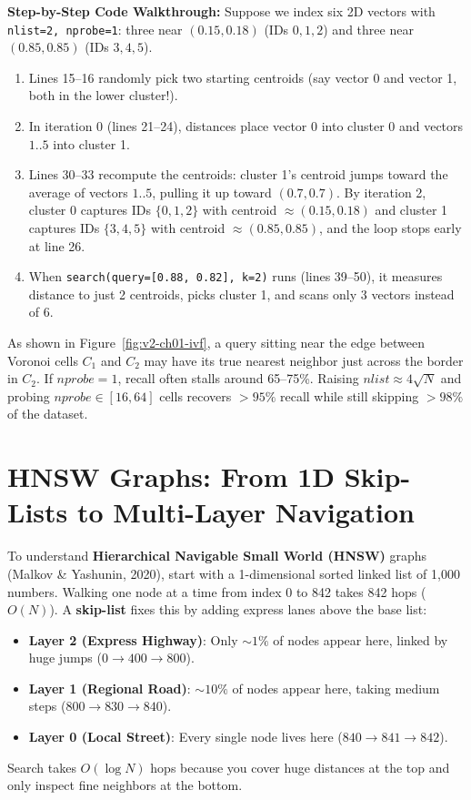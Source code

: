 \textbf{Step-by-Step Code Walkthrough:} Suppose we index six 2D vectors with \texttt{nlist=2, nprobe=1}: three near $(0.15, 0.18)$ (IDs $0, 1, 2$) and three near $(0.85, 0.85)$ (IDs $3, 4, 5$).
\begin{enumerate}[leftmargin=18pt]
  \item Lines 15--16 randomly pick two starting centroids (say vector 0 and vector 1, both in the lower cluster!).
  \item In iteration 0 (lines 21--24), distances place vector 0 into cluster 0 and vectors $1..5$ into cluster 1.
  \item Lines 30--33 recompute the centroids: cluster 1's centroid jumps toward the average of vectors $1..5$, pulling it up toward $(0.7, 0.7)$. By iteration 2, cluster 0 captures IDs $\{0, 1, 2\}$ with centroid $\approx (0.15, 0.18)$ and cluster 1 captures IDs $\{3, 4, 5\}$ with centroid $\approx (0.85, 0.85)$, and the loop stops early at line 26.
  \item When \texttt{search(query=[0.88, 0.82], k=2)} runs (lines 39--50), it measures distance to just 2 centroids, picks cluster 1, and scans only 3 vectors instead of 6.
\end{enumerate}

\begin{commonmistakebox}[Setting $nprobe=1$ on Boundary Queries]
As shown in Figure~\ref{fig:v2-ch01-ivf}, a query sitting near the edge between Voronoi cells $C_1$ and $C_2$ may have its true nearest neighbor just across the border in $C_2$. If $nprobe=1$, recall often stalls around 65--75\%. Raising $nlist \approx 4\sqrt{N}$ and probing $nprobe \in [16, 64]$ cells recovers $>95\%$ recall while still skipping $>98\%$ of the dataset.
\end{commonmistakebox}

\section{HNSW Graphs: From 1D Skip-Lists to Multi-Layer Navigation}

To understand \textbf{Hierarchical Navigable Small World (HNSW)} graphs (Malkov \& Yashunin, 2020), start with a 1-dimensional sorted linked list of 1,000 numbers. Walking one node at a time from index 0 to 842 takes 842 hops ($O(N)$). A \textbf{skip-list} fixes this by adding express lanes above the base list:
\begin{itemize}[leftmargin=18pt]
  \item \textbf{Layer 2 (Express Highway)}: Only $\sim 1\%$ of nodes appear here, linked by huge jumps ($0 \to 400 \to 800$).
  \item \textbf{Layer 1 (Regional Road)}: $\sim 10\%$ of nodes appear here, taking medium steps ($800 \to 830 \to 840$).
  \item \textbf{Layer 0 (Local Street)}: Every single node lives here ($840 \to 841 \to 842$).
\end{itemize}
Search takes $O(\log N)$ hops because you cover huge distances at the top and only inspect fine neighbors at the bottom.

